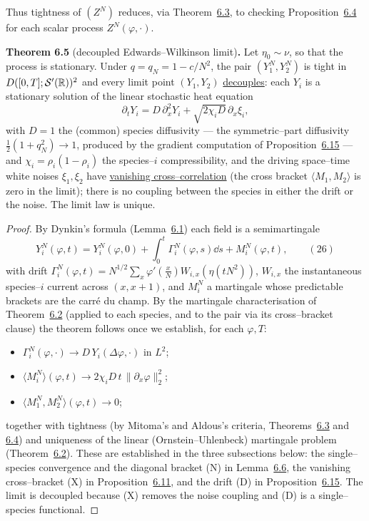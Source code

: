 \documentclass[11pt]{article}
\theoremstyle{plain}
\theoremstyle{definition}
\theoremstyle{remark}
\begin{document}
\noindent Thus tightness of $(Z^N)$ reduces, via Theorem~\hyperref[thm_mitoma]{6.3}, to checking
Proposition~\hyperref[prop_aldous]{6.4} for each scalar process $Z^N(\varphi,\cdot)$.

\label{thm_ewmain}\noindent\textbf{Theorem 6.5} (decoupled Edwards--Wilkinson limit)\textbf{.} 
Let $\eta_0\sim\nu$, so that the process is stationary. Under $q=q_N=1-c/N^2$, the
pair $(Y_1^N,Y_2^N)$ is tight in
$D([0,T];\mathcal S'(\mathbb{R}))^2$ and every limit point $(Y_1,Y_2)$ \underline{decouples}: each $Y_i$ is
a stationary solution of the linear stochastic heat equation
\[
  \partial_t Y_i=D\,\partial_x^2 Y_i+\sqrt{2\chi_i D}\,\partial_x\xi_i,
\]
with $D=1$ the (common) species diffusivity --- the symmetric--part diffusivity
$\tfrac12(1+q_N^2)\to1$, produced by the gradient computation of
Proposition~\hyperref[prop_drift]{6.15} --- and $\chi_i=\rho_i(1-\rho_i)$ the
species--$i$ compressibility,
and the driving space--time white noises $\xi_1,\xi_2$ have \underline{vanishing
cross--correlation} (the cross bracket $\langle M_1,M_2\rangle$ is zero in the limit);
there is no coupling between the species in either the drift or the noise. The limit
law is unique.
\par

\begin{proof}
By Dynkin's formula (Lemma~\hyperref[lem_dynkin]{6.1}) each field is a semimartingale
\label{eq_dynkin}
\begin{equation}
  Y_i^N(\varphi,t)=Y_i^N(\varphi,0)+\int_0^t\Gamma_i^N(\varphi,s)\dd s+M_i^N(\varphi,t),\qquad(26)
\end{equation}
with drift $\Gamma_i^N(\varphi,t)=N^{1/2}\sum_x\varphi'(\tfrac xN)W_{i,x}(\eta(tN^2))$,
$W_{i,x}$ the instantaneous species--$i$ current across $(x,x{+}1)$, and $M_i^N$ a
martingale whose predictable brackets are the carr\'e du champ. By the martingale
characterisation of Theorem~\hyperref[thm_mp]{6.2} (applied to each species, and to the pair via
its cross--bracket clause) the theorem follows once we establish, for each $\varphi,T$:
\begin{itemize}
\item[\textup{(D)}] $\Gamma_i^N(\varphi,\cdot)\to D\,Y_i(\Delta\varphi,\cdot)$ in $L^2$;
\item[\textup{(N)}] $\langle M_i^N\rangle(\varphi,t)\to 2\chi_i D\,t\,\|\partial_x\varphi\|_2^2$;
\item[\textup{(X)}] $\langle M_1^N,M_2^N\rangle(\varphi,t)\to0$;
\end{itemize}
together with tightness (by Mitoma's and Aldous's criteria,
Theorems~\hyperref[thm_mitoma]{6.3} and \hyperref[prop_aldous]{6.4}) and uniqueness of the linear
(Ornstein--Uhlenbeck) martingale problem (Theorem~\hyperref[thm_mp]{6.2}). These
are established in the three subsections below: the single--species convergence and the
diagonal bracket (N) in Lemma~\hyperref[lem_gauss]{6.6}, the vanishing cross--bracket (X) in
Proposition~\hyperref[prop_conc]{6.11}, and the drift (D) in Proposition~\hyperref[prop_drift]{6.15}. The
limit is decoupled because (X) removes the noise coupling and (D) is a single--species
functional.
\end{proof}
\end{document}
